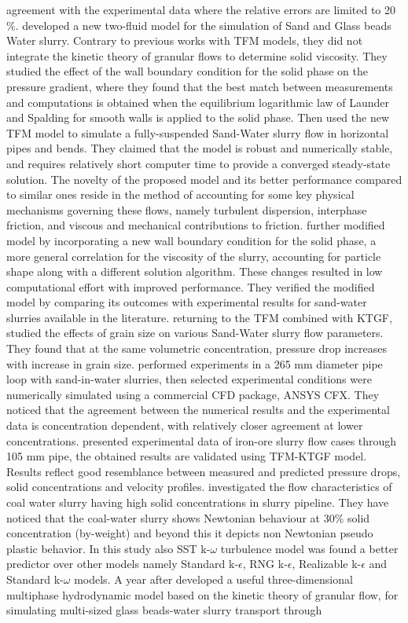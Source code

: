 \documentclass[11pt]{report}
\begin{document}
agreement with the experimental data where the relative errors are limited to 20$\%$. \citet{Messa-2013} developed a new two-fluid model for the simulation of Sand and Glass beads Water slurry. Contrary to previous works with TFM models, they did not integrate the kinetic theory of granular flows to determine solid viscosity. They studied the effect of the wall boundary condition for the solid phase on the pressure gradient, where they found that the best match between measurements and computations is obtained when the equilibrium logarithmic law of Launder and Spalding for smooth walls is applied to the solid phase. Then \citet{Messa-2014} used the new TFM model to  simulate a fully-suspended Sand-Water slurry flow in horizontal pipes and bends. They claimed that the model is robust and numerically stable, and requires relatively short computer time to provide a converged steady-state solution. The novelty of the proposed model and its better performance compared to similar ones reside in the method of accounting for some key physical mechanisms governing these flows, namely turbulent dispersion, interphase friction, and viscous and mechanical contributions to friction. \citet{Messa-2015} further modified \citet{Messa-2014} model by incorporating a new wall boundary condition for the solid phase, a more general correlation for the viscosity of the slurry, accounting for particle shape along with a different solution algorithm. These changes resulted in low computational effort with improved performance. They verified the modified model by comparing its outcomes with experimental results for sand-water slurries available in the literature. returning to the TFM combined with KTGF, \citet{Gopaliya-2014} studied the effects of grain size on various Sand-Water slurry flow parameters. They found that at the same  volumetric concentration, pressure drop increases with increase in grain size. \citet{Hashemi-2016} performed experiments in a 265 mm diameter pipe loop with sand-in-water slurries, then selected experimental conditions were  numerically simulated using a commercial CFD package, ANSYS CFX. They noticed that the agreement between the numerical results and the experimental data is  concentration dependent, with relatively closer agreement at lower concentrations. \citet{kumar2019experimental} presented experimental data of iron-ore slurry flow cases through 105 mm pipe, the obtained results are validated using TFM-KTGF model. Results reflect good resemblance between measured and predicted pressure drops, solid concentrations and velocity profiles. \citet{singh2020computational} investigated the flow characteristics of coal water slurry having high solid concentrations in slurry pipeline. They have noticed that the coal-water slurry shows Newtonian behaviour at 30$\%$ solid concentration (by-weight) and beyond this it depicts non Newtonian pseudo plastic behavior. In this study also  SST k-$\omega$ turbulence model was found a better predictor over other models namely Standard k-$\epsilon$, RNG k-$\epsilon$, Realizable k-$\epsilon$ and Standard k-$\omega$ models. A year after \citet{Li-2018a} developed a useful three-dimensional multiphase hydrodynamic model based on the kinetic theory of granular flow, for simulating multi-sized glass beads-water slurry transport through 
\end{document}
